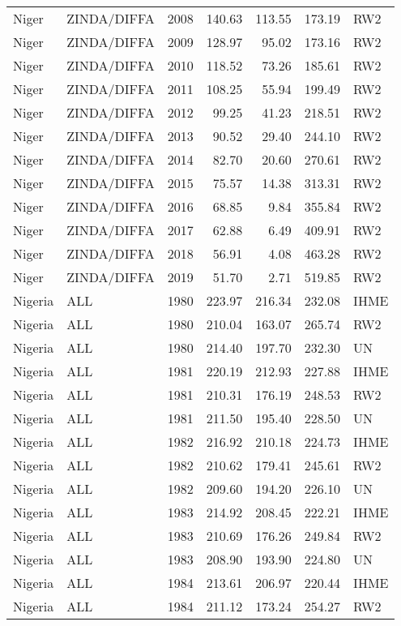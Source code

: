 \begin{longtable}{lllrrrl}
  Niger & ZINDA/DIFFA & 2008 & 140.63 & 113.55 & 173.19 & RW2 \\ 
  Niger & ZINDA/DIFFA & 2009 & 128.97 & 95.02 & 173.16 & RW2 \\ 
  Niger & ZINDA/DIFFA & 2010 & 118.52 & 73.26 & 185.61 & RW2 \\ 
  Niger & ZINDA/DIFFA & 2011 & 108.25 & 55.94 & 199.49 & RW2 \\ 
  Niger & ZINDA/DIFFA & 2012 & 99.25 & 41.23 & 218.51 & RW2 \\ 
  Niger & ZINDA/DIFFA & 2013 & 90.52 & 29.40 & 244.10 & RW2 \\ 
  Niger & ZINDA/DIFFA & 2014 & 82.70 & 20.60 & 270.61 & RW2 \\ 
  Niger & ZINDA/DIFFA & 2015 & 75.57 & 14.38 & 313.31 & RW2 \\ 
  Niger & ZINDA/DIFFA & 2016 & 68.85 & 9.84 & 355.84 & RW2 \\ 
  Niger & ZINDA/DIFFA & 2017 & 62.88 & 6.49 & 409.91 & RW2 \\ 
  Niger & ZINDA/DIFFA & 2018 & 56.91 & 4.08 & 463.28 & RW2 \\ 
  Niger & ZINDA/DIFFA & 2019 & 51.70 & 2.71 & 519.85 & RW2 \\ 
  Nigeria & ALL & 1980 & 223.97 & 216.34 & 232.08 & IHME \\ 
  Nigeria & ALL & 1980 & 210.04 & 163.07 & 265.74 & RW2 \\ 
  Nigeria & ALL & 1980 & 214.40 & 197.70 & 232.30 & UN \\ 
  Nigeria & ALL & 1981 & 220.19 & 212.93 & 227.88 & IHME \\ 
  Nigeria & ALL & 1981 & 210.31 & 176.19 & 248.53 & RW2 \\ 
  Nigeria & ALL & 1981 & 211.50 & 195.40 & 228.50 & UN \\ 
  Nigeria & ALL & 1982 & 216.92 & 210.18 & 224.73 & IHME \\ 
  Nigeria & ALL & 1982 & 210.62 & 179.41 & 245.61 & RW2 \\ 
  Nigeria & ALL & 1982 & 209.60 & 194.20 & 226.10 & UN \\ 
  Nigeria & ALL & 1983 & 214.92 & 208.45 & 222.21 & IHME \\ 
  Nigeria & ALL & 1983 & 210.69 & 176.26 & 249.84 & RW2 \\ 
  Nigeria & ALL & 1983 & 208.90 & 193.90 & 224.80 & UN \\ 
  Nigeria & ALL & 1984 & 213.61 & 206.97 & 220.44 & IHME \\ 
  Nigeria & ALL & 1984 & 211.12 & 173.24 & 254.27 & RW2 \\ 

\end{longtable}
